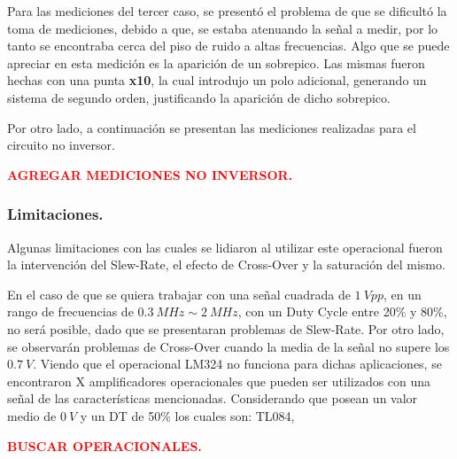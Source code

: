 Para las mediciones del tercer caso, se presentó el problema de que se dificultó la toma de mediciones, debido a que, se estaba atenuando la señal a medir, por lo tanto se encontraba cerca del piso de ruido a altas frecuencias. Algo que se puede apreciar en esta medición es la aparición de un sobrepico. Las mismas fueron hechas con una punta \textbf{x10}, la cual introdujo un polo adicional, generando un sistema de segundo orden, justificando la aparición de dicho sobrepico.

Por otro lado, a continuación se presentan las mediciones realizadas para el circuito no inversor.

\begin{center}
\textcolor{red}{\textbf{AGREGAR MEDICIONES NO INVERSOR.}}
\end{center}

\subsubsection{Limitaciones.}
Algunas limitaciones con las cuales se lidiaron al utilizar este operacional fueron la intervención del Slew-Rate, el efecto de Cross-Over y la saturación del mismo.

En el caso de que se quiera trabajar con una señal cuadrada de $1 \ Vpp$, en un rango de frecuencias de $0.3 \ MHz \sim 2 \ MHz$, con un Duty Cycle entre 20\% y 80\%, no será posible, dado que se presentaran problemas de Slew-Rate. Por otro lado, se observarán problemas de Cross-Over cuando la media de la señal no supere los $0.7 \ V$.
Viendo que el operacional LM324 no funciona para dichas aplicaciones, se encontraron X amplificadores operacionales que pueden ser utilizados con una señal de las características mencionadas. Considerando que posean un valor medio de $0 \ V$ y un DT de 50\% los cuales son: TL084,

\begin{center}
\textcolor{red}{\textbf{BUSCAR OPERACIONALES.}}
\end{center}

